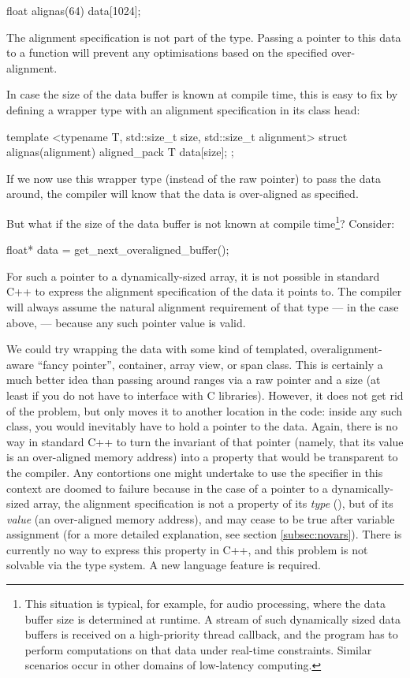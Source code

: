 \begin{codeblock}
float alignas(64) data[1024];
\end{codeblock}

The alignment specification is not part of the type. Passing a pointer to this data to a function will prevent any optimisations based on the specified over-alignment.

In case the size of the data buffer is known at compile time, this is easy to fix by defining a wrapper type with an alignment specification in its class head:

\begin{codeblock}
template <typename T, std::size_t size, std::size_t alignment>
struct alignas(alignment) aligned_pack
{
   T data[size];
};
\end{codeblock}

If we now use this wrapper type (instead of the raw pointer) to pass the data around, the compiler will know that the data is over-aligned as specified.

But what if the size of the data buffer is not known at compile time\footnote{This situation is typical, for example, for audio processing, where the data buffer size is determined at runtime. A stream of such dynamically sized data buffers  is received on a high-priority thread callback, and the program has to perform computations on that data under real-time constraints. Similar scenarios occur in other domains of low-latency computing.}? Consider:
\begin{codeblock}
float* data = get_next_overaligned_buffer();
\end{codeblock}
For such a pointer to a dynamically-sized array, it is not possible in standard C++ to express the alignment specification of the data it points to. The compiler will always assume the natural alignment requirement of that type  --- in the case above,  --- because any such pointer value is valid. 

We could try wrapping the data with some kind of templated, overalignment-aware ``fancy pointer'', container, array view, or span class. This is certainly a much better idea than passing around ranges via a raw pointer and a size (at least if you do not have to interface with C libraries). However, it does not get rid of the problem, but only moves it to another location in the code: inside any such class, you would inevitably have to hold a pointer to the data. Again, there is no way in standard C++ to turn the invariant of that pointer (namely, that its value is an over-aligned memory address) into a property that would be transparent to the compiler. Any contortions one might undertake to use the  specifier in this context are doomed to failure because in the case of a pointer to a dynamically-sized array, the alignment specification is not a property of its \emph{type} (), but of its \emph{value} (an over-aligned memory address), and may cease to be true after variable assignment (for a more detailed explanation, see section \ref{subsec:novars}). There is currently no way to express this property in C++, and this problem is not solvable via the type system. A new language feature is required.




